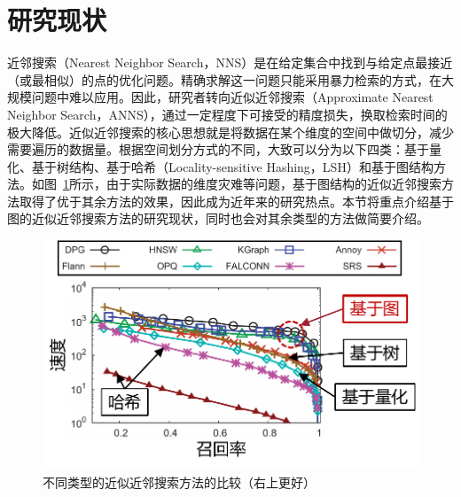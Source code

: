 \section{研究现状}

近邻搜索（Nearest Neighbor Search，NNS）是在给定集合中找到与给定点最接近（或最相似）的点的优化问题\cite{nns-wiki}。精确求解这一问题只能采用暴力检索的方式，在大规模问题中难以应用。因此，研究者转向近似近邻搜索（Approximate Nearest Neighbor Search，ANNS），通过一定程度下可接受的精度损失，换取检索时间的极大降低。近似近邻搜索的核心思想就是将数据在某个维度的空间中做切分，减少需要遍历的数据量。根据空间划分方式的不同，大致可以分为以下四类：基于量化\cite{pq-2010, opq-2013, douze2016polysemous, zhang2019grip, kalantidis2014locally, abdelhadi2019accelerated}、基于树结构\cite{kdtree-2008, Annoy, houle2014rank,arora2018hd, muja2014scalable, wang2013trinary}、基于哈希（Locality-sensitive Hashing，LSH）\cite{lsh-1999, lsh-2004, sh-2008, sun2014srs, terasawa2007spherical, liu2014sk}和基于图结构\cite{kgraph-2011, nsw-2014, hnsw-2018, nsg-2019, dpg-2019}方法。如图~\ref{fig:ganns-vs-other}所示，由于实际数据的维度灾难等问题，基于图结构的近似近邻搜索方法取得了优于其余方法的效果，因此成为近年来的研究热点。本节将重点介绍基于图的近似近邻搜索方法的研究现状，同时也会对其余类型的方法做简要介绍。

\begin{figure}
  \centering
  \includegraphics[width=0.7\linewidth]{figures/Introduction/ganns-vs-other.pdf}
  \caption{不同类型的近似近邻搜索方法的比较\cite{dpg-2019}（右上更好）}
  \label{fig:ganns-vs-other}
\end{figure}


